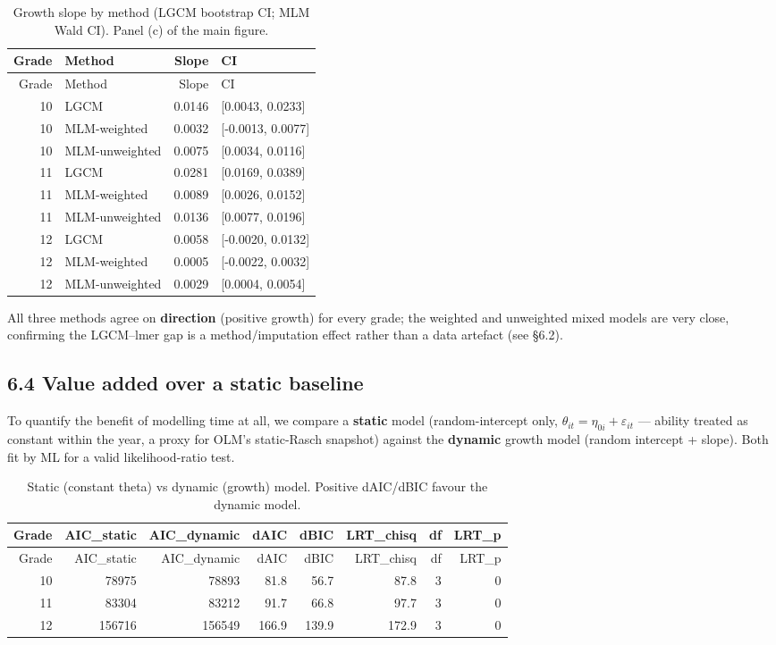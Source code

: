 \documentclass[
]{article}
\begin{document}
\begin{longtable}[]{@{}rlrl@{}}
\caption{Growth slope by method (LGCM bootstrap CI; MLM Wald CI). Panel
(c) of the main figure.}\tabularnewline
\toprule
Grade & Method & Slope & CI \\
\midrule
\endfirsthead
\toprule
Grade & Method & Slope & CI \\
\midrule
\endhead
10 & LGCM & 0.0146 & {[}0.0043, 0.0233{]} \\
10 & MLM-weighted & 0.0032 & {[}-0.0013, 0.0077{]} \\
10 & MLM-unweighted & 0.0075 & {[}0.0034, 0.0116{]} \\
11 & LGCM & 0.0281 & {[}0.0169, 0.0389{]} \\
11 & MLM-weighted & 0.0089 & {[}0.0026, 0.0152{]} \\
11 & MLM-unweighted & 0.0136 & {[}0.0077, 0.0196{]} \\
12 & LGCM & 0.0058 & {[}-0.0020, 0.0132{]} \\
12 & MLM-weighted & 0.0005 & {[}-0.0022, 0.0032{]} \\
12 & MLM-unweighted & 0.0029 & {[}0.0004, 0.0054{]} \\
\bottomrule
\end{longtable}

All three methods agree on \textbf{direction} (positive growth) for
every grade; the weighted and unweighted mixed models are very close,
confirming the LGCM--lmer gap is a method/imputation effect rather than
a data artefact (see §6.2).

\hypertarget{value-added-over-a-static-baseline}{%
\subsection{6.4 Value added over a static
baseline}\label{value-added-over-a-static-baseline}}

To quantify the benefit of modelling time at all, we compare a
\textbf{static} model (random-intercept only,
\(\theta_{it} = \eta_{0i} + \varepsilon_{it}\) --- ability treated as
constant within the year, a proxy for OLM's static-Rasch snapshot)
against the \textbf{dynamic} growth model (random intercept + slope).
Both fit by ML for a valid likelihood-ratio test.

\begin{longtable}[]{@{}rrrrrrrr@{}}
\caption{Static (constant theta) vs dynamic (growth) model. Positive
dAIC/dBIC favour the dynamic model.}\tabularnewline
\toprule
Grade & AIC\_static & AIC\_dynamic & dAIC & dBIC & LRT\_chisq & df &
LRT\_p \\
\midrule
\endfirsthead
\toprule
Grade & AIC\_static & AIC\_dynamic & dAIC & dBIC & LRT\_chisq & df &
LRT\_p \\
\midrule
\endhead
10 & 78975 & 78893 & 81.8 & 56.7 & 87.8 & 3 & 0 \\
11 & 83304 & 83212 & 91.7 & 66.8 & 97.7 & 3 & 0 \\
12 & 156716 & 156549 & 166.9 & 139.9 & 172.9 & 3 & 0 \\
\bottomrule
\end{longtable}
\end{document}
